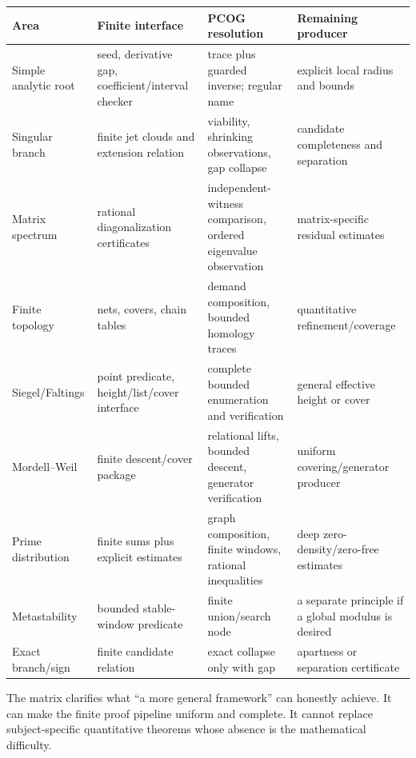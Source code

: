 \begin{longtable}{@{}p{}p{}p{}p{}@{}}
\toprule
Area & Finite interface & PCOG resolution & Remaining producer \\
\midrule
\endhead
Simple analytic root & seed, derivative gap, coefficient/interval checker &
trace plus guarded inverse; regular name & explicit local radius and bounds \\
Singular branch & finite jet clouds and extension relation & viability,
shrinking observations, gap collapse & candidate completeness and separation \\
Matrix spectrum & rational diagonalization certificates & independent-witness
comparison, ordered eigenvalue observation & matrix-specific residual estimates \\
Finite topology & nets, covers, chain tables & demand composition, bounded
homology traces & quantitative refinement/coverage \\
Siegel/Faltings & point predicate, height/list/cover interface & complete
bounded enumeration and verification & general effective height or cover \\
Mordell--Weil & finite descent/cover package & relational lifts, bounded descent,
generator verification & uniform covering/generator producer \\
Prime distribution & finite sums plus explicit estimates & graph composition,
finite windows, rational inequalities & deep zero-density/zero-free estimates \\
Metastability & bounded stable-window predicate & finite union/search node & a
separate principle if a global modulus is desired \\
Exact branch/sign & finite candidate relation & exact collapse only with gap &
apartness or separation certificate \\
\bottomrule
\end{longtable}

The matrix clarifies what ``a more general framework'' can honestly achieve.
It can make the finite proof pipeline uniform and complete.  It cannot replace
subject-specific quantitative theorems whose absence is the mathematical
difficulty.
